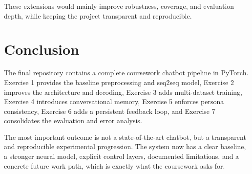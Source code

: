 \documentclass[11pt,a4paper]{article}
\begin{document}
These extensions would mainly improve robustness, coverage, and evaluation depth, while keeping the project transparent and reproducible.

\section{Conclusion}
The final repository contains a complete coursework chatbot pipeline in PyTorch. Exercise 1 provides the baseline preprocessing and seq2seq model, Exercise 2 improves the architecture and decoding, Exercise 3 adds multi-dataset training, Exercise 4 introduces conversational memory, Exercise 5 enforces persona consistency, Exercise 6 adds a persistent feedback loop, and Exercise 7 consolidates the evaluation and error analysis.

The most important outcome is not a state-of-the-art chatbot, but a transparent and reproducible experimental progression. The system now has a clear baseline, a stronger neural model, explicit control layers, documented limitations, and a concrete future work path, which is exactly what the coursework asks for.
\end{document}
